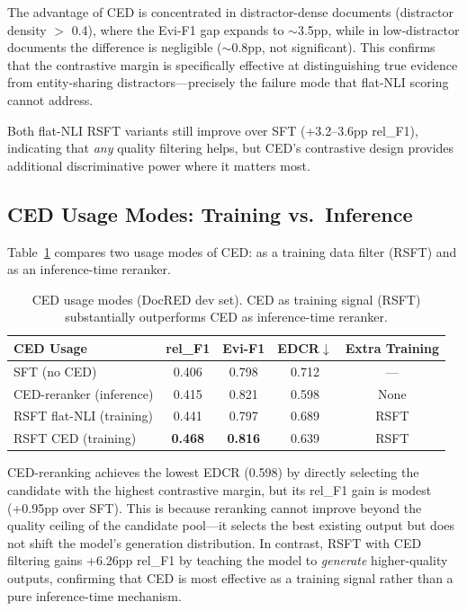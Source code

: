 \documentclass[11pt,a4paper]{article}
\newcommand{\ced}{CED}
\newcommand{\edcr}{EDCR}
\newcommand{\rsft}{RSFT}
\begin{document}
The advantage of \ced{} is concentrated in distractor-dense documents (distractor density $>$ 0.4), where the Evi-F1 gap expands to ${\sim}$3.5pp, while in low-distractor documents the difference is negligible (${\sim}$0.8pp, not significant).
This confirms that the contrastive margin is specifically effective at distinguishing true evidence from entity-sharing distractors---precisely the failure mode that flat-NLI scoring cannot address.

Both flat-NLI \rsft{} variants still improve over SFT (+3.2--3.6pp rel\_F1), indicating that \emph{any} quality filtering helps, but \ced{}'s contrastive design provides additional discriminative power where it matters most.

\subsection{\ced{} Usage Modes: Training vs.\ Inference}
\label{sec:ced_usage}

Table~\ref{tab:ced_modes} compares two usage modes of \ced{}: as a training data filter (\rsft{}) and as an inference-time reranker.

\begin{table}[t]
\centering
\small
\caption{CED usage modes (DocRED dev set). CED as training signal (\rsft{}) substantially outperforms CED as inference-time reranker.}
\label{tab:ced_modes}
\begin{tabular}{@{}lcccc@{}}
\toprule
\textbf{CED Usage} & \textbf{rel\_F1} & \textbf{Evi-F1} & \textbf{\edcr{}$\downarrow$} & \textbf{Extra Training} \\
\midrule
SFT (no CED)                & 0.406 & 0.798 & 0.712 & --- \\
CED-reranker (inference)     & 0.415 & 0.821 & 0.598 & None \\
\rsft{} flat-NLI (training)  & 0.441 & 0.797 & 0.689 & \rsft{} \\
\rsft{} CED (training)       & \textbf{0.468} & \textbf{0.816} & 0.639 & \rsft{} \\
\bottomrule
\end{tabular}
\end{table}

CED-reranking achieves the lowest \edcr{} (0.598) by directly selecting the candidate with the highest contrastive margin, but its rel\_F1 gain is modest (+0.95pp over SFT).
This is because reranking cannot improve beyond the quality ceiling of the candidate pool---it selects the best existing output but does not shift the model's generation distribution.
In contrast, \rsft{} with CED filtering gains +6.26pp rel\_F1 by teaching the model to \emph{generate} higher-quality outputs, confirming that CED is most effective as a training signal rather than a pure inference-time mechanism.
\end{document}
